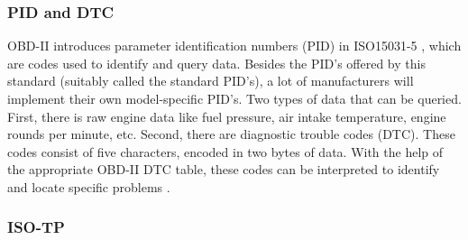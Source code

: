 \subsubsection{PID and DTC}
\label{subsec:obd:pid}

OBD-II introduces parameter identification numbers (PID) in ISO15031-5 \cite{ISO15031-5}, which are codes used to identify and query data. Besides the PID's offered by this standard (suitably called the standard PID's), a lot of manufacturers will implement their own model-specific PID's. Two types of data that can be queried. First, there is raw engine data like fuel pressure, air intake temperature, engine rounds per minute, etc. Second, there are diagnostic trouble codes (DTC). These codes consist of five characters, encoded in two bytes of data. With the help of the appropriate OBD-II DTC table, these codes can be interpreted to identify and locate specific problems \cite{wiki:PID}.

\subsubsection{ISO-TP}

